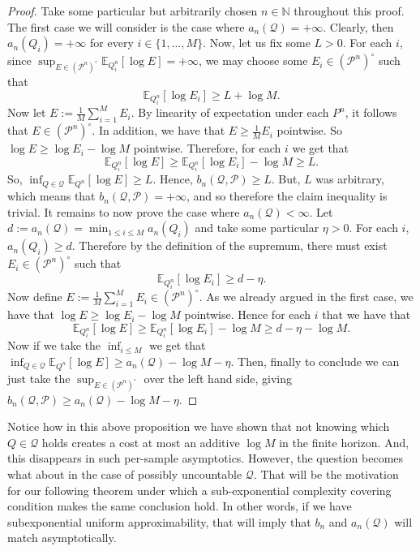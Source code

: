 \documentclass[11pt]{article}
\newcommand{\E}{\mathbb{E}}
\newcommand{\Pcal}{\mathcal{P}}
\newcommand{\Qcal}{\mathcal{Q}}
\theoremstyle{definition}
\theoremstyle{definition}
\begin{document}
\begin{proof}
Take some particular but arbitrarily chosen $n\in\mathbb N$ throughout this proof. The first case we will consider is the case where \underline{$a_n(\Qcal)=+\infty$}. Clearly, then $a_n(Q_i)=+\infty$ for every $i\in\{1,\dots, M\}$. Now, let us fix some $L>0$. For each $i$, since $\sup_{E\in(\Pcal^n)^\circ}\E_{Q_i^n}[\log E]=+\infty$, we may choose some $E_i\in(\Pcal^n)^\circ$ such that
\[
\E_{Q_i^n}[\log E_i]\ge L+\log M.
\]
Now let $E:=\frac1M\sum_{i=1}^M E_i$. By linearity of expectation under each $P^n$, it follows that $E\in(\Pcal^n)^\circ$. In addition, we have that $E\ge \frac1M E_i$ pointwise. So $\log E\ge \log E_i-\log M$ pointwise. Therefore, for each $i$ we get that
\[
\E_{Q_i^n}[\log E] \ge \E_{Q_i^n}[\log E_i]-\log M \ge L.
\]
So, $\inf_{Q\in\Qcal}\E_{Q^n}[\log E]\ge L$. Hence, $b_n(\Qcal,\Pcal)\ge L$. But, $L$ was arbitrary, which means that $b_n(\Qcal,\Pcal)=+\infty$, and so therefore the claim inequality is trivial. It remains to now prove the case where \underline{$a_n(\Qcal)<\infty$}. Let $d:=a_n(\Qcal)=\min_{1\le i\le M}a_n(Q_i)$ and take some particular $\eta>0$. For each $i$, $a_n(Q_i)\ge d$. Therefore by the definition of the supremum, there must exist $E_i\in(\Pcal^n)^\circ$ such that
\[
\E_{Q_i^n}[\log E_i]\ge d-\eta.
\]
Now define $E:=\frac1M\sum_{i=1}^M E_i\in(\Pcal^n)^\circ$. As we already argued in the first case, we have that $\log E\ge \log E_i-\log M$ pointwise. Hence for each $i$ that we have that
\[
\E_{Q_i^n}[\log E]\ge \E_{Q_i^n}[\log E_i]-\log M\ge d-\eta-\log M.
\]
Now if we take the $\inf_{i\le M}$ we get that $\inf_{Q\in\Qcal}\E_{Q^n}[\log E]\ge a_n(\Qcal)-\log M-\eta$. Then, finally to conclude we can just take the $\sup_{E\in(\Pcal^n)^\circ}$ over the left hand side, giving $b_n(\Qcal,\Pcal)\ge a_n(\Qcal)-\log M-\eta$.
\end{proof}

Notice how in this above proposition we have shown that not knowing which $Q\in\Qcal$ holds creates a cost at most an additive $\log M$ in the finite horizon. And, this disappears in such per-sample asymptotics. However, the question becomes what about in the case of possibly uncountable $\Qcal$. That will be the motivation for our following theorem under which a sub-exponential complexity covering condition makes the same conclusion hold. In other words, if we have subexponential uniform approximability, that will imply that $b_n$ and $a_n(\Qcal)$ will match asymptotically.
\end{document}
